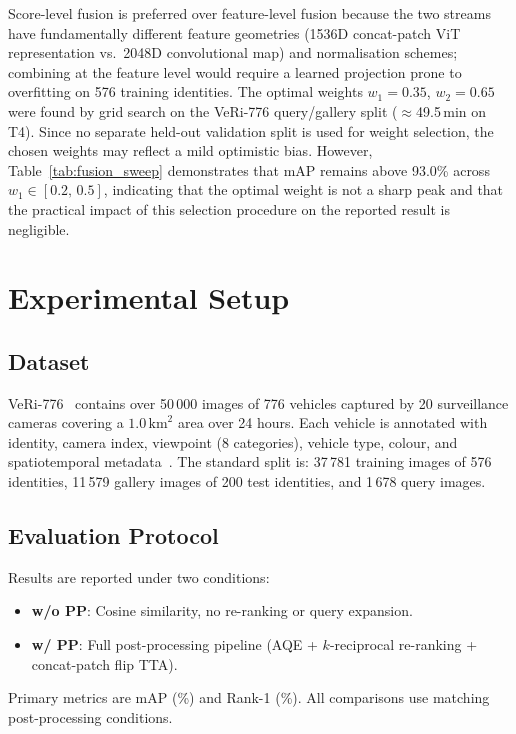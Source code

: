 \documentclass[11pt]{article}
\begin{document}
Score-level fusion is preferred over feature-level fusion because the two
streams have fundamentally different feature geometries (1536D concat-patch
ViT representation vs.\ 2048D convolutional map) and normalisation schemes; combining at the
feature level would require a learned projection prone to overfitting on
576 training identities. The optimal weights $w_1{=}0.35$, $w_2{=}0.65$
were found by grid search on the VeRi-776 query/gallery split
($\approx$49.5\,min on T4). Since no separate held-out validation split
is used for weight selection, the chosen weights may reflect a mild
optimistic bias. However, Table~\ref{tab:fusion_sweep} demonstrates
that mAP remains above 93.0\% across $w_1 \in [0.2,\,0.5]$, indicating
that the optimal weight is not a sharp peak and that the practical impact
of this selection procedure on the reported result is negligible.

\section{Experimental Setup}
\label{sec:setup}

\subsection{Dataset}
VeRi-776~\cite{liu2016veri,liu2018provid} contains over 50\,000 images of
776 vehicles captured by 20 surveillance cameras covering a
$1.0\,\text{km}^{2}$ area over 24 hours. Each vehicle is annotated with
identity, camera index, viewpoint (8 categories), vehicle type, colour, and
spatiotemporal metadata~\cite{liu2018provid}. The standard split is:
37\,781 training images of 576 identities, 11\,579 gallery images of 200
test identities, and 1\,678 query images.

\subsection{Evaluation Protocol}
Results are reported under two conditions:
\begin{itemize}
  \item \textbf{w/o PP}: Cosine similarity, no re-ranking or query expansion.
  \item \textbf{w/ PP}: Full post-processing pipeline (AQE + $k$-reciprocal
    re-ranking + concat-patch flip TTA).
\end{itemize}
Primary metrics are mAP (\%) and Rank-1 (\%). All comparisons use matching
post-processing conditions.
\end{document}
